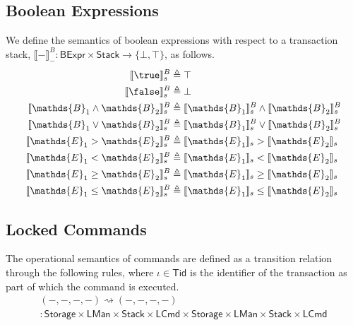 \subsection{Boolean Expressions}

We define the semantics of boolean expressions with respect to a transaction stack, $\llbracket - \rrbracket_-^B : \mathsf{BExpr} \times \mathsf{Stack} \rightarrow \{ \bot, \top \}$, as follows.
\begin{align*}
\llbracket \true \rrbracket_s^B &\triangleq \top \\
\llbracket \false \rrbracket_s^B &\triangleq \bot \\
\llbracket \mathds{B}_1 \land \mathds{B}_2 \rrbracket_s^B &\triangleq \llbracket \mathds{B}_1 \rrbracket_s^B \land \llbracket \mathds{B}_2 \rrbracket_s^B \\
\llbracket \mathds{B}_1 \lor \mathds{B}_2 \rrbracket_s^B &\triangleq \llbracket \mathds{B}_1 \rrbracket_s^B \lor \llbracket \mathds{B}_2 \rrbracket_s^B \\
\llbracket \mathds{E}_1 > \mathds{E}_2 \rrbracket_s^B &\triangleq \llbracket \mathds{E}_1 \rrbracket_s > \llbracket \mathds{E}_2 \rrbracket_s \\
\llbracket \mathds{E}_1 < \mathds{E}_2 \rrbracket_s^B &\triangleq \llbracket \mathds{E}_1 \rrbracket_s < \llbracket \mathds{E}_2 \rrbracket_s \\
\llbracket \mathds{E}_1 \geq \mathds{E}_2 \rrbracket_s^B &\triangleq \llbracket \mathds{E}_1 \rrbracket_s \geq \llbracket \mathds{E}_2 \rrbracket_s \\
\llbracket \mathds{E}_1 \leq \mathds{E}_2 \rrbracket_s^B &\triangleq \llbracket \mathds{E}_1 \rrbracket_s \leq \llbracket \mathds{E}_2 \rrbracket_s \\
\end{align*}

\subsection{Locked Commands}

The operational semantics of commands are defined as a transition relation through the following rules, where $\iota \in \mathsf{Tid}$ is the identifier of the transaction as part of which the command is executed.
\begin{gather*}
(-, -, -, -) \rightsquigarrow (-, -, -, -) \\
: \mathsf{Storage} \times \mathsf{LMan} \times \mathsf{Stack} \times \mathsf{LCmd} \times \mathsf{Storage} \times \mathsf{LMan} \times \mathsf{Stack} \times \mathsf{LCmd}
\end{gather*}

